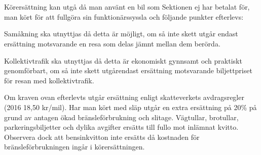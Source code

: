 \documentclass[10pt]{article}
\begin{document}
    \section*{\doctitle}

    Körersättning kan utgå då man använt en bil som Sektionen ej har betalat för, man kört för att fullgöra sin funktionärssyssla och följande punkter efterlevs:

    \begin{dashlist}
        \item Samåkning ska utnyttjas då detta är möjligt, om så inte skett utgår endast ersättning motsvarande en resa som delas jämnt mellan dem berörda.

        \item Kollektivtrafik ska utnyttjas då detta är ekonomiskt gynnsamt och praktiskt genomförbart, om så inte skett utgårendast ersättning motsvarande biljettpriset för resan med kollektivtrafik.
    \end{dashlist}

    Om kraven ovan efterlevts utgår ersättning enligt skatteverkets avdragsregler (2016 18,50 kr/mil). Har man kört med släp utgår en extra ersättning på 20\% på grund av antagen ökad bränsleförbrukning och slitage. Vägtullar, brotullar, parkeringsbiljetter och dylika avgifter ersätts till fullo mot inlämnat kvitto. Observera dock att bensinkvitton inte ersätts då kostnaden för bränsleförbrukningen ingår i körersättningen.
\end{document}
